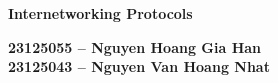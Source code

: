 \begin{titlepage}
\begin{center}
\begin{flushleft}
    \fontsize{14pt}{17pt}\selectfont  
\end{flushleft}

    \fontsize{15pt}{17pt}\selectfont 
    \textbf{\textrm{Internetworking Protocols}}


\vspace*{7cm} 
{\large\bf 23125055 -- Nguyen Hoang Gia Han}\\

\vspace*{0.5cm} 
{\large\bf 23125043 -- Nguyen Van Hoang Nhat}\\

\end{center}
\end{titlepage}